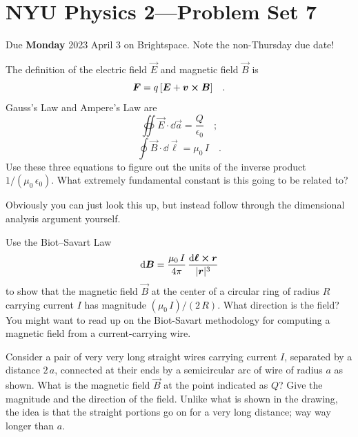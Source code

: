 \documentclass[12pt]{article}
\begin{document}
\section*{NYU Physics 2---Problem Set 7}

Due \textbf{Monday} 2023 April 3 on Brightspace. Note the non-Thursday due date!

\startproblem%
The definition of the electric field $\vec{E}$ and magnetic field
$\vec{B}$ is
\begin{equation}
  \boldsymbol{F} = q\,[\boldsymbol{E} + \boldsymbol{v}\cross\boldsymbol{B}]
  \quad .
\end{equation}
Gauss's Law and Ampere's Law are
\begin{equation}
  \oiint\vec{E}\cdot\dd\vec{a} = \frac{Q}{\epsilon_0}
  \quad ;
\end{equation}
\begin{equation}
  \oint\vec{B}\cdot\dd\vec{\ell} = \mu_0\,I
  \quad .
\end{equation}
Use these three equations to figure out the units of the inverse
product $1/(\mu_0\,\epsilon_0)$. What extremely fundamental constant
is this going to be related to?

Obviously you can just look this up, but instead follow through the
dimensional analysis argument yourself.

\startproblem%
Use the Biot--Savart Law
\begin{equation}
  \dd\boldsymbol{B} = \frac{\mu_0\,I}{4\pi}\,\frac{\dd\boldsymbol{\ell}\cross\boldsymbol{r}}{|\boldsymbol{r}|^3}
\end{equation}
to show that the magnetic field $\vec{B}$ at the center of a circular
ring of radius $R$ carrying current $I$ has magnitude
$(\mu_0\,I)/(2\,R)$. What direction is the field? You might want to
read up on the Biot-Savart methodology for computing a magnetic field
from a current-carrying wire.

\startproblem%
Consider a pair of very very long straight wires carrying current $I$,
separated by a distance $2\,a$, connected at their ends by a
semicircular arc of wire of radius $a$ as shown. What is the magnetic
field $\vec{B}$ at the point indicated as $Q$? Give the magnitude and
the direction of the field. Unlike what is shown in the drawing,
the idea is that the straight portions go on for a very long distance;
way way longer than $a$.
\end{document}
